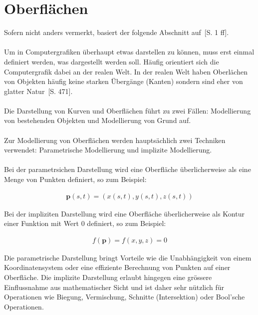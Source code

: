 
\section{Oberflächen}
\label{sec:surfaces}

Sofern nicht anders vermerkt, basiert der folgende Abschnitt
auf~\cite{division_introduction_1996}[S. 1 ff].\\
\\
Um in Computergrafiken überhaupt etwas darstellen zu können, muss erst einmal
definiert werden, was dargestellt werden soll. Häufig orientiert sich die
Computergrafik dabei an der realen Welt.  In der realen Welt haben Oberlächen
von Objekten häufig keine starken Übergänge (Kanten) sondern sind eher von
glatter Natur~\cite{foley_computer_1996}[S. 471].\\
\\
Die Darstellung von Kurven und Oberflächen führt zu zwei Fällen: Modellierung
von bestehenden Objekten und Modellierung von Grund auf.\\
\\
Zur Modellierung von Oberflächen werden hauptsächlich zwei Techniken verwendet:
Parametrische Modellierung und implizite Modellierung.\\
\\
Bei der parametrsichen Darstellung wird eine Oberfläche überlicherweise als
eine Menge von Punkten definiert, so zum Beispiel:


\begin{gather}\label{eq:surface_parametric}
    \bm{p}(s, t) = (x(s, t), y(s, t), z(s, t))
\end{gather}

Bei der impliziten Darstellung wird eine Oberfläche überlicherweise als Kontur
einer Funktion mit Wert 0 definiert, so zum Beispiel:

\begin{gather}\label{eq:surface_implicit}
    f(\bm{p}) = f(x, y, z) = 0
\end{gather}

Die parametrische Darstellung bringt Vorteile wie die Unabhängigkeit von einem
Koordinatensystem oder eine effiziente Berechnung von Punkten auf einer
Oberfläche. Die implizite Darstellung erlaubt hingegen eine grössere
Einflussnahme aus mathematischer Sicht und ist daher sehr nützlich für
Operationen wie Biegung, Vermischung, Schnitte (Intersektion) oder Bool'sche
Operationen.

